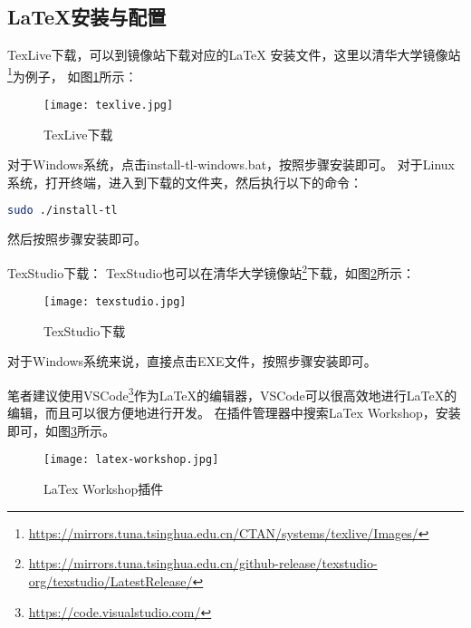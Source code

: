 \documentclass[lang=cn,a4paper,newtx]{elegantpaper}
\begin{document}
\subsection{LaTeX安装与配置}
TexLive下载，可以到镜像站下载对应的\LaTeX{} 安装文件，这里以清华大学镜像站\footnote{\url{https://mirrors.tuna.tsinghua.edu.cn/CTAN/systems/texlive/Images/}}为例子，
如图\ref{fig:texlive}所示：
\begin{figure}[hbpt]
  \centering
  \texttt{[image: texlive.jpg]}
  \caption{TexLive下载}
  \label{fig:texlive}
\end{figure}

对于Windows系统，点击install-tl-windows.bat，按照步骤安装即可。
对于Linux系统，打开终端，进入到下载的文件夹，然后执行以下的命令：
\begin{lstlisting}[language=bash]
  sudo ./install-tl
\end{lstlisting}
然后按照步骤安装即可。

TexStudio下载：
TexStudio也可以在清华大学镜像站\footnote{\url{https://mirrors.tuna.tsinghua.edu.cn/github-release/texstudio-org/texstudio/LatestRelease/}}下载，如图\ref{fig:texstudio}所示：
\begin{figure}[hbpt]
  \centering
  \texttt{[image: texstudio.jpg]}
  \caption{TexStudio下载}
  \label{fig:texstudio}
\end{figure}

对于Windows系统来说，直接点击EXE文件，按照步骤安装即可。

笔者建议使用VSCode\footnote{\url{https://code.visualstudio.com/}}作为LaTeX的编辑器，VSCode可以很高效地进行LaTeX的编辑，而且可以很方便地进行开发。
在插件管理器中搜索LaTex Workshop，安装即可，如图\ref{fig:latex-workshop}所示。
\begin{figure}[hbpt]
  \centering
  \texttt{[image: latex-workshop.jpg]}
  \caption{LaTex Workshop插件}
  \label{fig:latex-workshop}
\end{figure}
\end{document}
